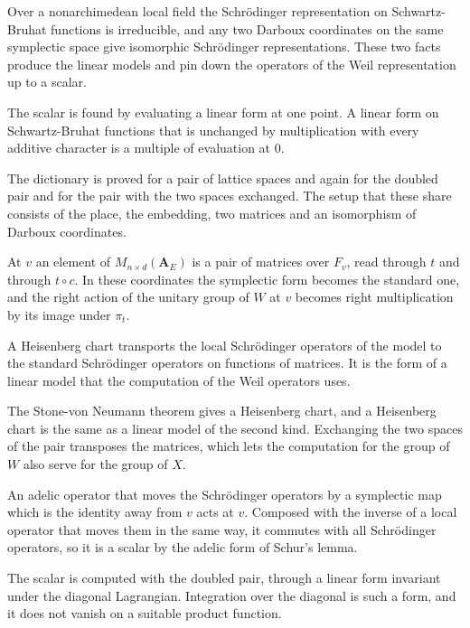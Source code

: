 Over a nonarchimedean local field the Schrödinger representation on
Schwartz-Bruhat functions is irreducible, and any two Darboux coordinates on the
same symplectic space give isomorphic Schrödinger representations. These two
facts produce the linear models and pin down the operators of the Weil
representation up to a scalar.

The scalar is found by evaluating a linear form at one point. A linear form on
Schwartz-Bruhat functions that is unchanged by multiplication with every
additive character is a multiple of evaluation at $0$.

The dictionary is proved for a pair of lattice spaces and again for the doubled
pair and for the pair with the two spaces exchanged. The setup that these share
consists of the place, the embedding, two matrices and an isomorphism of
Darboux coordinates.

At $v$ an element of $M_{n\times d}(\mathbf A_E)$ is a pair of matrices over
$F_v$, read through $t$ and through $t\circ c$. In these coordinates the
symplectic form becomes the standard one, and the right action of the unitary
group of $W$ at $v$ becomes right multiplication by its image under $\pi_t$.

A Heisenberg chart transports the local Schrödinger operators of the model to
the standard Schrödinger operators on functions of matrices. It is the form of
a linear model that the computation of the Weil operators uses.

The Stone-von Neumann theorem gives a Heisenberg chart, and a Heisenberg chart
is the same as a linear model of the second kind. Exchanging the two spaces of
the pair transposes the matrices, which lets the computation for the group of
$W$ also serve for the group of $X$.

An adelic operator that moves the Schrödinger operators by a symplectic map which
is the identity away from $v$ acts at $v$. Composed with the inverse of a local
operator that moves them in the same way, it commutes with all Schrödinger
operators, so it is a scalar by the adelic form of Schur's lemma.

The scalar is computed with the doubled pair, through a linear form invariant
under the diagonal Lagrangian. Integration over the diagonal is such a form, and
it does not vanish on a suitable product function.

